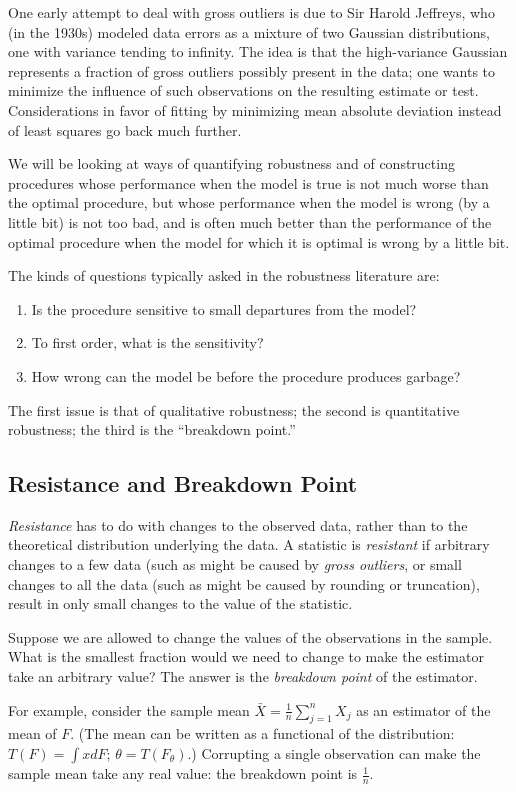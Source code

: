 One early attempt to deal with gross outliers is due to Sir Harold
Jeffreys, who (in the 1930s) modeled data errors as a mixture of two Gaussian distributions,
one with variance tending to infinity.  
The idea is that the high-variance Gaussian represents a fraction of gross outliers possibly
present in the data; one wants to minimize the influence of such observations
on the resulting estimate or test.
Considerations in favor of fitting by minimizing mean
absolute deviation instead of least squares go back much further.

We will be looking at ways of quantifying robustness and of constructing
procedures whose performance when the model is true is not much worse than
the optimal procedure, but whose performance when the model is wrong (by a little
bit) is not too bad, and is often much better than the performance of the
optimal procedure when the model for which it is optimal 
is wrong by a little bit.

The kinds of questions typically asked in the robustness literature are:
\begin{enumerate}
    \item Is the procedure sensitive to small departures from the model?
    \item To first order, what is the sensitivity?
    \item How wrong can the model be before the procedure produces garbage?
\end{enumerate}
The first issue is that of qualitative robustness; the second is quantitative robustness;
the third is the ``breakdown point.''

\subsection{Resistance and Breakdown Point}
{\em Resistance} has to do with changes to the observed data, rather than to the
theoretical distribution underlying the data.
A statistic is {\em resistant} if arbitrary changes to a few data (such as
might be caused by {\em gross outliers}, or small changes
to all the data (such as might be caused by rounding or truncation),
result in only small changes to the value of the statistic.

Suppose we are allowed to change the values of the observations in the sample.
What is the smallest fraction would we need to change to make the 
estimator take an arbitrary value?
The answer is the {\em breakdown point\/} of the estimator.

For example, consider the sample mean $\bar{X} = \frac{1}{n} \sum_{j=1}^n X_j$
as an estimator of the mean of $F$. 
(The mean can be written as a functional of
the distribution: $T(F) = \int x dF$; $\theta = T(F_\theta)$.)
Corrupting a single observation can make the sample mean take any real value:
the breakdown point is $\frac{1}{n}$.

